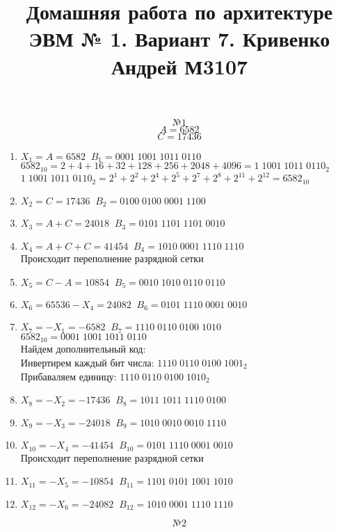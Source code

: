 \documentclass{article}
\title{Домашняя работа по архитектуре ЭВМ № 1. Вариант 7. Кривенко Андрей М3107}
\begin{document}
\maketitle
\[ № 1 \]
\[ A = 6582 \]
\[ C = 17436 \]
\begin{enumerate}
  \item $ X_{1} = A = 6582 \; \; B_{1} = 0001 \; 1001 \; 1011 \; 0110 $ \\ 
 $ 6582_{10} = 2 + 4 + 16 + 32 + 128 + 256 + 2048 + 4096 = 1 \; 1001 \; 1011 \; 0110_{2} $
 $ 1 \; 1001 \; 1011 \; 0110_{2} = 2^{1} + 2^{2} +2^{4} + 2^{5} + 2^{7} + 2^{8} + 2^{11} + 2^{12} = 6582_{10} $
  \item $ X_{2} = C = 17436 \; \; B_{2} = 0100 \; 0100 \; 0001 \; 1100 $
  \item $ X_{3} = A + C = 24018 \; \; B_{3} = 0101 \; 1101 \; 1101 \; 0010 $
  \item $ X_{4} = A + C + C = 41454 \; \; B_{4} = 1010 \; 0001 \; 1110 \; 1110 $ \\
  Происходит переполнение разрядной сетки
  \item $ X_{5} = C - A = 10854 \; \; B_{5} = 0010 \; 1010 \; 0110 \; 0110 $
  \item $ X_{6} = 65536 - X_{4} = 24082 \; \; B_{6} = 0101 \; 1110 \; 0001 \; 0010 $
  \item $ X_{7} = -X_{1} = -6582 \; \; B_{7} = 1110 \; 0110 \; 0100 \; 1010 $ \\
  $ 6582_{10} = 0001 \; 1001 \; 1011 \; 0110 $ \\
  Найдем дополнительный код: \\
  Инвертирем каждый бит числа: $ 1110 \; 0110 \; 0100 \; 1001_{2} $ \\
  Прибаваляем единицу: $ 1110 \; 0110 \; 0100 \; 1010_{2} $
  \item $ X_{8} = -X_{2} = -17436 \; \; B_{8} = 1011 \; 1011 \; 1110 \; 0100 $
  \item $ X_{9} = -X_{3} = -24018 \; \; B_{9} = 1010 \; 0010 \; 0010 \; 1110 $
  \item $ X_{10} = -X_{4} = -41454 \; \; B_{10} = 0101 \; 1110 \; 0001 \; 0010 $ \\
  Происходит переполнение разрядной сетки
  \item $ X_{11} = -X_{5} = -10854 \; \; B_{11} = 1101 \; 0101 \; 1001 \; 1010 $
  \item $ X_{12} = -X_{6} = -24082 \; \; B_{12} = 1010 \; 0001 \; 1110 \; 1110 $
\end{enumerate}
\[ № 2 \]
\end{document}
